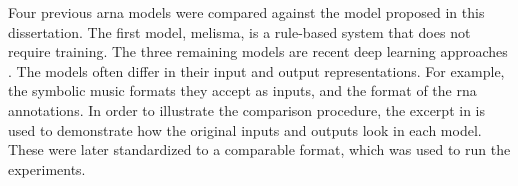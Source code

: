 
Four previous \gls{arna} models were compared against the
model proposed in this dissertation. The first model,
\gls{melisma}, is a rule-based system that does not require
training. The three remaining models are recent deep
learning approaches \parencite{chen2021attend,
micchi2021deep, mcleod2021modular}. The models often differ
in their input and output representations. For example, the
symbolic music formats they accept as inputs, and the format
of the \gls{rna} annotations. In order to illustrate the
comparison procedure, the excerpt in  is
used to demonstrate how the original inputs and outputs look
in each model. These were later standardized to a comparable
format, which was used to run the experiments.

